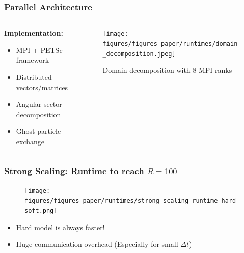 \documentclass[10pt,t]{beamer}
\begin{document}
\begin{frame}
    \frametitle{Parallel Architecture}

    \begin{columns}[c]
        \begin{column}{0.5\textwidth}
            \textbf{Implementation:}
            \begin{itemize}
                \item MPI + PETSc framework
                \item Distributed vectors/matrices
                \item Angular sector decomposition
                \item Ghost particle exchange
            \end{itemize}
        \end{column}

        \begin{column}{0.5\textwidth}
            \vspace{-0.3cm}
            \begin{figure}
                \centering
                \texttt{[image: figures/figures\_paper/runtimes/domain\_decomposition.jpeg]}
                \caption*{\scriptsize{Domain decomposition with 8 MPI ranks}}
            \end{figure}
        \end{column}
    \end{columns}

\end{frame}

\begin{frame}
    \frametitle{Strong Scaling: Runtime to reach $R=100$}

    \begin{figure}
        \centering
        \texttt{[image: figures/figures\_paper/runtimes/strong\_scaling\_runtime\_hard\_soft.png]}
    \end{figure}

    \begin{itemize}
        \item Hard model is always faster!
        \item Huge communication overhead (Especially for small $\Delta t$)
    \end{itemize}

\end{frame}
\end{document}
